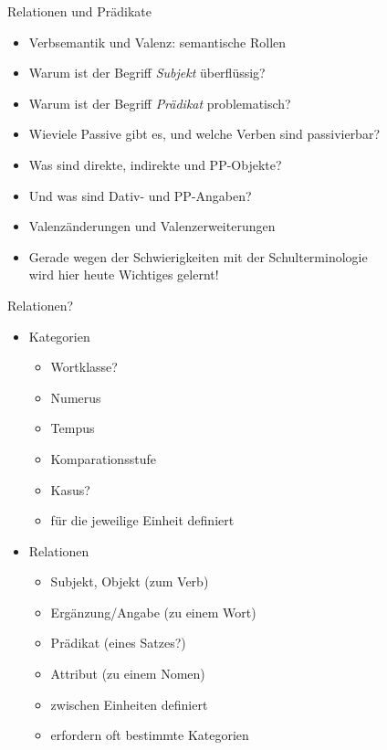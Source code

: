 \begin{frame}
  {Relationen und Prädikate}
  \pause
  \begin{itemize}[<+->]
    \item Verbsemantik und Valenz: semantische Rollen
      \Halbzeile
    \item Warum ist der Begriff \textit{Subjekt} überflüssig?
    \item Warum ist der Begriff \textit{Prädikat} problematisch?
    \item Wieviele Passive gibt es, und welche Verben sind passivierbar?
    \item Was sind direkte, indirekte und PP-Objekte?
    \item Und was sind Dativ- und PP-Angaben?
      \Halbzeile
    \item \alert{Valenzänderungen} und \alert{Valenzerweiterungen}
      \Halbzeile
    \item Gerade \alert{wegen} der Schwierigkeiten mit der Schulterminologie\\
      wird hier heute Wichtiges gelernt!
  \end{itemize}

\end{frame}

\begin{frame}
  {Relationen?}
  \pause
  \begin{itemize}[<+->]
    \item \alert{Kategorien}
      \begin{itemize}[<+->]
        \item Wortklasse?
        \item Numerus
        \item Tempus
        \item Komparationsstufe
        \item Kasus?
          \Halbzeile
        \item \alert{für die jeweilige Einheit definiert}
      \end{itemize}
      \Halbzeile
    \item \alert{Relationen}
      \begin{itemize}[<+->]
        \item Subjekt, Objekt (zum Verb)
        \item Ergänzung\slash Angabe (zu einem Wort)
        \item Prädikat (eines Satzes?)
        \item Attribut (zu einem Nomen)
          \Halbzeile
        \item \alert{zwischen Einheiten definiert}
        \item \alert{erfordern oft bestimmte Kategorien}
      \end{itemize}
  \end{itemize}
  \pause
  \Halbzeile
\end{frame}

